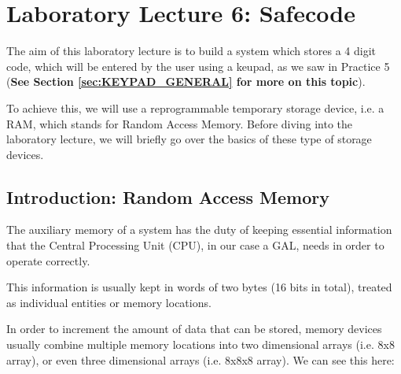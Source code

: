 \section{Laboratory Lecture 6: Safecode}

The aim of this laboratory lecture is to build a system which stores a 4 digit code, which will be entered by the user using a keupad, as we saw in Practice 5 (\textbf{See Section \ref{sec:KEYPAD_GENERAL} for more on this topic}).\medskip

To achieve this, we will use a reprogrammable temporary storage device, i.e. a RAM, which stands for Random Access Memory. Before diving into the laboratory lecture, we will briefly go over the basics of these type of storage devices.


\subsection{Introduction: Random Access Memory}

The auxiliary memory of a system has the duty of keeping essential information that the Central Processing Unit (CPU), in our case a GAL, needs in order to operate correctly.\medskip

This information is usually kept in words of two bytes (16 bits in total), treated as individual entities or memory locations.\medskip

In order to increment the amount of data that can be stored, memory devices usually combine multiple memory locations into two dimensional arrays (i.e. 8x8 array), or even three dimensional arrays (i.e. 8x8x8 array). We can see this here:\medskip

